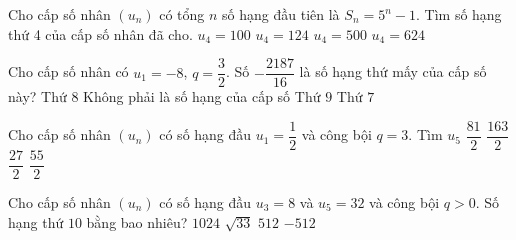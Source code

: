 \begin{ex}%
	Cho cấp số  nhân $(u_n)$ có tổng $n$ số hạng đầu tiên là $S_n=5^n-1$. Tìm số hạng thứ 4 của cấp số nhân đã cho.
	\choice 
		{$u_4=100$} 
		 {$u_4=124$}
		 {\True $u_4=500$}
		{$u_4=624$} 
\end{ex}

\begin{ex}%
	Cho cấp số nhân có $u_1=-8$, $q=\dfrac{3}{2}$. Số $-\dfrac{2187}{16}$ là số hạng thứ mấy của cấp  số này?
	 \choice
		{\True Thứ $8$} 
		{Không phải là số hạng  của cấp số}
		{Thứ  $9$}
		 {Thứ $7$}
\end{ex}

\begin{ex}%
	Cho cấp số nhân $\left(u_n\right)$ có số hạng đầu $u_1=\dfrac{1}{2}$ và công  bội $q=3$. Tìm $u_5$
	\choice 
		 {\True $\dfrac{81}{2}$}
		{$\dfrac{163}{2}$} 
		{$\dfrac{27}{2}$} 
		 {$\dfrac{55}{2}$}
\end{ex}

\begin{ex}%
	Cho cấp số nhân $(u_n)$ có số hạng đầu $u_3=8$ và $u_5=32$ và công bội $q>0$.  Số hạng thứ $10$ bằng bao nhiêu?
	\choice 
		{\True $1024$} 
		 {$\sqrt{33}$}
		{$512$} 
		{$-512$} 
\end{ex}

